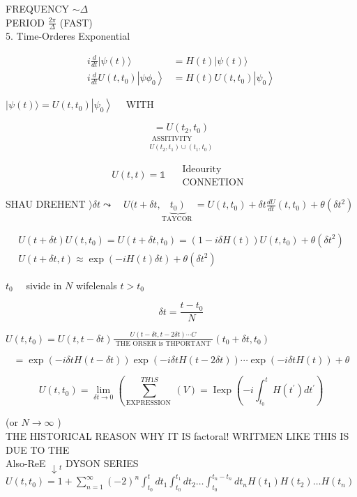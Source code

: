\documentclass[10pt]{article}
\begin{document}
FREQUENCY $\sim \Delta$\\
PERIOD $\frac{2 \pi}{\Delta}$ (FAST)\\
5. Time-Orderes Exponential

$$
\begin{aligned}
i \frac{d}{d t}|\psi(t)\rangle & =H(t)|\psi(t)\rangle \\
i \frac{d}{d t} U\left(t, t_{0}\right)\left|\psi \phi_{0}\right\rangle & =H(t) U\left(t, t_{0}\right)\left|\psi_{0}\right\rangle
\end{aligned}
$$

$|\psi(t)\rangle=U\left(t, t_{0}\right)\left|\psi_{0}\right\rangle \quad$ WITH

$$
\underset{\substack{\text { ASSITIVITY } \\ U\left(t_{2}, t_{1}\right) \cup\left(t_{1}, t_{0}\right)}}{=U\left(t_{2}, t_{0}\right)}
$$

$$
U(t, t)=\mathbb{1} \quad \begin{gathered}
\text { Ideourity } \\
\text { CONNETION }
\end{gathered}
$$

SHAU DREHENT $\rangle \delta t \leadsto \quad U(t+\delta t, \underbrace{\left.t_{0}\right)}_{\text {TAYCOR }}=U\left(t, t_{0}\right)+\delta t \frac{d U}{d t}\left(t, t_{0}\right)+\theta\left(\delta t^{2}\right)$

$$
\begin{gathered}
U(t+\delta t) U\left(t, t_{0}\right)=U\left(t+\delta t, t_{0}\right)=(1-i \delta H(t)) U\left(t, t_{0}\right)+\theta\left(\delta t^{2}\right) \\
U(t+\delta t, t) \approx \exp (-i H(t) \delta t)+\theta\left(\delta t^{2}\right)
\end{gathered}
$$

$t_{0} \quad$ sivide in $N$ wifelenals $t>t_{0}$

$$
\delta t=\frac{t-t_{0}}{N}
$$

$U\left(t, t_{0}\right)=U(t, t-\delta t) \frac{U(t-\delta t, t-2 \delta t) \cdots C}{\text { THE ORSER is THPORTANT }}\left(t_{0}+\delta t, t_{0}\right)$

$$
=\exp (-i \delta t H(t-\delta t)) \exp (-i \delta t H(t-2 \delta t)) \cdots \exp (-i \delta t H(t))+\theta
$$

$$
U\left(t, t_{0}\right)=\lim _{\delta t \rightarrow 0}\left(\sum_{\text {EXPRESSION }}^{T H 1 S}(V)=\operatorname{Iexp}\left(-i \int_{t_{0}}^{t} H\left(t^{\prime}\right) d t^{\prime}\right)\right.
$$

(or $N \rightarrow \infty$ )\\
THE HISTORICAL REASON WHY IT IS factoral! WRITMEN LIKE THIS IS DUE TO THE\\
Also-ReE $\downarrow{ }_{t}$ DYSON SERIES\\
$U\left(t, t_{0}\right)=1+\sum_{n=1}^{\infty}(-2)^{n} \int_{t_{0}}^{t} d t_{1} \int_{t_{0}}^{t_{1}} d t_{2} \ldots \int_{t_{0}}^{t_{n}-t_{n}} d t_{n} H\left(t_{1}\right) H\left(t_{2}\right) \ldots H\left(t_{n}\right)$
\end{document}
